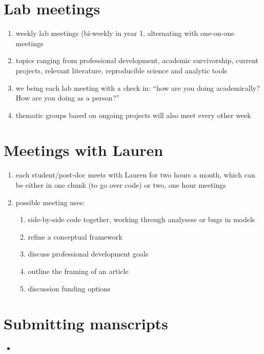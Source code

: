 \documentclass[12pt]{article}
\begin{document}
\section{Lab meetings}
\begin{enumerate}
\item weekly lab meetings (bi-weekly in year 1, alternating with
  one-on-one meetings
\item topics ranging from professional development, academic
  survivorship, current projects, relevant literature, reproducible
  science and analytic tools
\item we being each lab meeting with a check in: ``how are you doing
  academically? How are you doing as a person?'' 
\item thematic groups based on ongoing projects will also meet every
  other week
\end{enumerate}

\section{Meetings with Lauren}
\begin{enumerate}
\item each student/post-doc meets with Lauren for two hours a month,
  which can be either in one chunk (to go over code) or two, one hour
  meetings
\item possible meeting uses:
  \begin{enumerate}
  \item side-by-side code together, working through analysese or bugs
    in models
  \item refine a conceptual framework
  \item discuss professional development goals
  \item outline the framing of an article
  \item discussion funding options
  \end{enumerate}
\end{enumerate}

\section{Submitting manscripts}
\begin{itemize}
\item 
\end{itemize}
\end{document}
